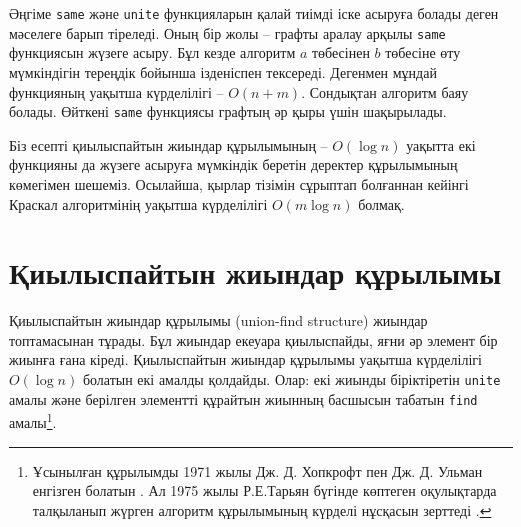 Әңгіме \texttt{same} және \texttt{unite} функцияларын 
қалай тиімді іске асыруға болады деген мәселеге барып тіреледі. Оның бір жолы -- графты аралау арқылы  \texttt{same} функциясын жүзеге асыру. Бұл кезде алгоритм $a$ төбесінен $b$ төбесіне өту 
мүмкіндігін тереңдік бойынша ізденіспен тексереді. 
Дегенмен мұндай функцияның уақытша күрделілігі -- $O(n+m)$.
Сондықтан алгоритм баяу болады. Өйткені \texttt{same} функциясы
графтың әр қыры үшін шақырылады.

Біз есепті қиылыспайтын жиындар құрылымының -- $O(\log n)$ уақытта екі функцияны да жүзеге асыруға мүмкіндік беретін деректер құрылымының көмегімен шешеміз. Осылайша, қырлар тізімін сұрыптап болғаннан кейінгі
Краскал алгоритмінің уақытша күрделілігі $O(m \log n)$ болмақ.

\section{Қиылыспайтын жиындар құрылымы}


Қиылыспайтын жиындар құрылымы (union-find structure) жиындар топтамасынан
тұрады. Бұл жиындар екеуара қиылыспайды, яғни әр элемент бір жиынға ғана кіреді.
Қиылыспайтын жиындар құрылымы
уақытша күрделілігі $O(\log n)$ болатын екі амалды қолдайды. Олар: екі жиынды біріктіретін
\texttt{unite} амалы және берілген элементті құрайтын жиынның басшысын табатын 
\texttt{find} амалы\footnote{Ұсынылған құрылымды 1971 жылы Дж. Д. Хопкрофт пен Дж. Д. Ульман енгізген болатын \cite{hop71}.
Ал 1975 жылы Р.Е.Тарьян бүгінде көптеген оқулықтарда талқыланып жүрген алгоритм құрылымының күрделі нұсқасын зерттеді \cite{tar75}.}.


